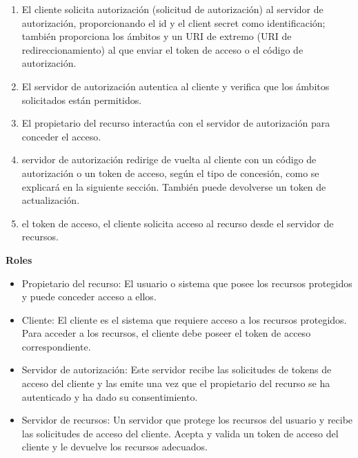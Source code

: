 \documentclass[12pt,letterpaper]{article}
\begin{document}
\begin{enumerate}
    \item El cliente solicita autorización (solicitud de autorización) al servidor de autorización, proporcionando el id y el client secret como identificación; también proporciona los ámbitos y un URI de extremo (URI de redireccionamiento) al que enviar el token de acceso o el código de autorización.
    \item El servidor de autorización autentica al cliente y verifica que los ámbitos solicitados están permitidos.
    \item El propietario del recurso interactúa con el servidor de autorización para conceder el acceso.
    \item servidor de autorización redirige de vuelta al cliente con un código de autorización o un token de acceso, según el tipo de concesión, como se explicará en la siguiente sección. También puede devolverse un token de actualización.
    \item el token de acceso, el cliente solicita acceso al recurso desde el servidor de recursos.
\end{enumerate}

\textbf{Roles} \\
\begin{itemize}
    \item Propietario del recurso: El usuario o sistema que posee los recursos protegidos y puede conceder acceso a ellos. 
\end{itemize}
\begin{itemize}
    \item Cliente: El cliente es el sistema que requiere acceso a los recursos protegidos. Para acceder a los recursos, el cliente debe poseer el token de acceso correspondiente.
\end{itemize}
\begin{itemize}
    \item Servidor de autorización: Este servidor recibe las solicitudes de tokens de acceso del cliente y las emite una vez que el propietario del recurso se ha autenticado y ha dado su consentimiento.
\end{itemize}
\begin{itemize}
    \item Servidor de recursos: Un servidor que protege los recursos del usuario y recibe las solicitudes de acceso del cliente. Acepta y valida un token de acceso del cliente y le devuelve los recursos adecuados.
\end{itemize}
\end{document}
